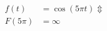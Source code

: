 \documentclass[preview]{standalone}
\begin{document}
\begin{align*}
f(t)&=\cos{(5\pi t)} \Updownarrow \\ F(5\pi)&=\infty
\end{align*}
\end{document}
